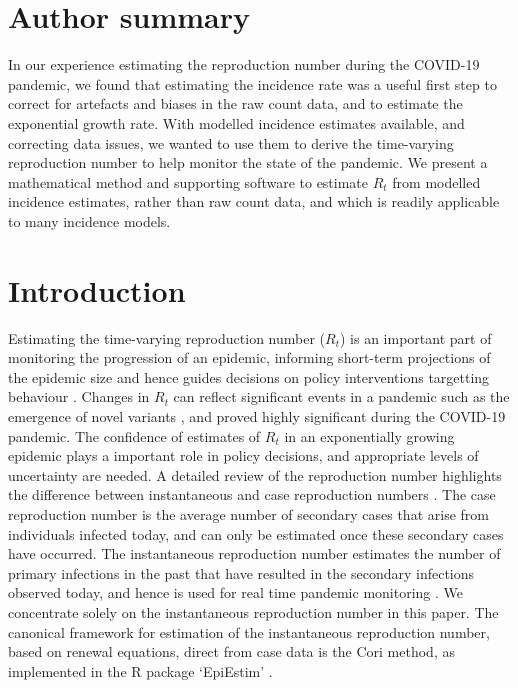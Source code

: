\documentclass[10pt,letterpaper]{article}
\begin{document}

\section*{Author summary}

In our experience estimating the reproduction number during the COVID-19 pandemic, we found that estimating the incidence rate was a useful first step to correct for artefacts and biases in the raw count data, and to estimate the exponential growth rate. With modelled incidence estimates available, and correcting data issues, we wanted to use them to derive the time-varying reproduction number to help monitor the state of the pandemic. We present a mathematical method and supporting software to estimate $R_t$ from modelled incidence estimates, rather than raw count data, and which is readily applicable to many incidence models.

\linenumbers

\section*{Introduction}

Estimating the time-varying reproduction number ($R_t$) is an important part of monitoring the progression of an epidemic, informing short-term projections of the epidemic size and hence guides decisions on policy interventions targetting behaviour \cite{gostic2020}. Changes in $R_t$ can reflect significant events in a pandemic such as the emergence of novel variants \cite{davies2021}, and proved highly significant during the COVID-19 pandemic. The confidence of estimates of $R_t$ in an exponentially growing epidemic plays a important role in policy decisions, and appropriate levels of uncertainty are needed. A detailed review of the reproduction number highlights the difference between instantaneous and case reproduction numbers \cite{vegvari2022}. The case reproduction number is the average number of secondary cases that arise from individuals infected today, and can only be estimated once these secondary cases have occurred. The instantaneous reproduction number estimates the number of primary infections in the past that have resulted in the secondary infections observed today, and hence is used for real time pandemic monitoring \cite{gostic2020}. We concentrate solely on the instantaneous reproduction number in this paper. The canonical framework for estimation of the instantaneous reproduction number, based on renewal equations, direct from case data is the Cori method, as implemented in the R package `EpiEstim' \cite{cori2013, thompson2019}.
\end{document}
